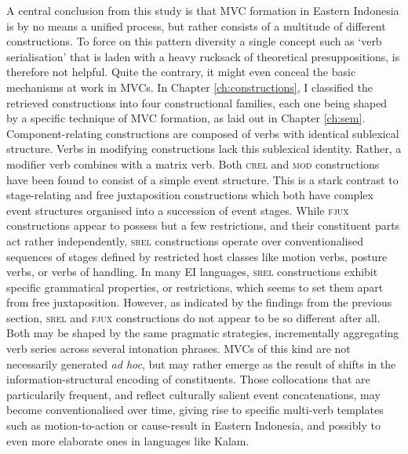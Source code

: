 A central conclusion from this study is that MVC formation in Eastern Indonesia is by no means a unified process, but rather consists of a multitude of different constructions. To force on this pattern diversity a single concept such as `verb serialisation' that is laden with a heavy rucksack of theoretical presuppositions, is therefore not helpful. Quite the contrary, it might even conceal the basic mechanisms at work in MVCs. In Chapter \ref{ch:constructions}, I classified the retrieved constructions into four constructional families, each one being shaped by a specific technique of MVC formation, as laid out in Chapter \ref{ch:sem}. Component-relating constructions are composed of verbs with identical sublexical structure. Verbs in modifying constructions lack this sublexical identity. Rather, a modifier verb combines with a matrix verb. Both \textsc{crel} and \textsc{mod} constructions have been found to consist of a simple event structure. This is a stark contrast to stage-relating and free juxtaposition constructions which both have complex event structures organised into a succession of event stages. While \textsc{fjux} constructions appear to possess but a few restrictions, and their constituent parts act rather independently, \textsc{srel} constructions operate over conventionalised sequences of stages defined by restricted host classes like motion verbs, posture verbs, or verbs of handling. In many EI languages, \textsc{srel} constructions exhibit specific grammatical properties, or restrictions, which seems to set them apart from free juxtaposition. However, as indicated by the findings from the previous section, \textsc{srel} and \textsc{fjux} constructions do not appear to be so different after all. Both may be shaped by the same pragmatic strategies, incrementally aggregating verb series across several intonation phrases. MVCs of this kind are not necessarily generated \textit{ad hoc}, but may rather emerge as the result of shifts in the information-structural encoding of constituents. Those collocations that are particularily frequent, and reflect culturally salient event concatenations, may become conventionalised over time, giving rise to specific multi-verb templates such as motion-to-action or cause-result in Eastern Indonesia, and possibly to even more elaborate ones in languages like Kalam.

